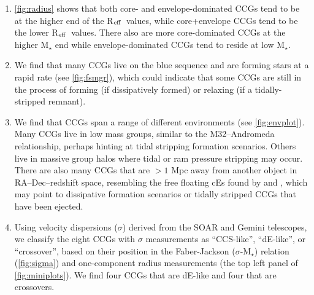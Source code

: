 \documentclass[iop,apj]{emulateapj}
\newcommand{\Reff}{R$_{\rm eff}$}
\begin{document}
\begin{enumerate}
\item \autoref{fig:radius} shows that both core- and envelope-dominated CCGs tend to be at the higher end of the \Reff\ values, while core+envelope CCGs tend to be the lower \Reff\ values. There also are more core-dominated CCGs at the higher M$_{\star}$ end while envelope-dominated CCGs tend to reside at low M$_{\star}$.

\item We find that many CCGs live on the blue sequence and are forming stars at a rapid rate (see \autoref{fig:fsmgr}), which could indicate that some CCGs are still in the process of forming (if dissipatively formed) or relaxing (if a tidally-stripped remnant).

\item We find that CCGs span a range of different environments (see \autoref{fig:envplot}). Many CCGs live in low mass groups, similar to the M32--Andromeda relationship, perhaps hinting at tidal stripping formation scenarios. Others live in massive group halos where tidal or ram pressure stripping may occur. There are also many CCGs that are $>1$ Mpc away from another object in RA--Dec--redshift space, resembling the free floating cEs found by \citet{Huxor2013} and \citet{Paudel2014}, which may point to dissipative formation scenarios or tidally stripped CCGs that have been ejected.

\item Using velocity dispersions ($\sigma$) derived from the SOAR and Gemini telescopes, we classify the eight CCGs with $\sigma$ measurements as ``CCS-like'', ``dE-like'', or ``crossover'', based on their position in the Faber-Jackson ($\sigma$-M$_{\star}$) relation (\autoref{fig:sigma}) and one-component radius measurements (the top left panel of \autoref{fig:miniplots}). We find four CCGs that are dE-like and four that are crossovers.


\end{enumerate}
\end{document}
